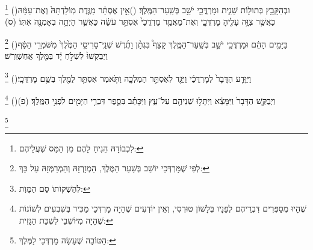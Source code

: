 \documentclass[12pt, openany]{book}
\newcommand{\footnotecomment}[1]{
	\renewcommand\thefootnote{}
	\footnote{\textsf{#1}}}
\newcommand{\commenta}[1]{\footnotecomment{#1}\hspace{0em}}
\newcommand{\vsnum}[1]{(\hebrewnumeral{#1})\space}
\begin{document}
\begin{multicols}{2}
\commenta{ לִכְבוֹדָהּ הֵנִיחַ לָהֶם מִן הַמַּס שֶׁעֲלֵיהֶם:}%
\vsnum{19}וּבְהִקָּבֵ֥ץ בְּתוּל֖וֹת שֵׁנִ֑ית וּמָרְדֳּכַ֖י יֹשֵׁ֥ב בְּשַֽׁעַר־הַמֶּֽלֶךְ׃
\vsnum{20}אֵ֣ין אֶסְתֵּ֗ר מַגֶּ֤דֶת מֽוֹלַדְתָּהּ֙ וְאֶת־עַמָּ֔הּ כַּאֲשֶׁ֛ר צִוָּ֥ה עָלֶ֖יהָ מָרְדֳּכָ֑י וְאֶת־מַאֲמַ֤ר מָרְדֳּכַי֙ אֶסְתֵּ֣ר עֹשָׂ֔ה כַּאֲשֶׁ֛ר הָיְתָ֥ה בְאָמְנָ֖ה אִתּֽוֹ׃ (ס)%
\commenta{ לְפִי שֶׁמָּרְדְּכַי יוֹשֵׁב בְּשַׁעַר הַמֶּלֶךְ, הַמְזָרְזָהּ וְהַמְרַמְּזָהּ עַל כָּךְ: }%
\vsnum{21}בַּיָּמִ֣ים הָהֵ֔ם וּמָרְדֳּכַ֖י יֹשֵׁ֣ב בְּשַֽׁעַר־הַמֶּ֑לֶךְ קָצַף֩ בִּגְתָ֨ן וָתֶ֜רֶשׁ שְׁנֵֽי־סָרִיסֵ֤י הַמֶּ֙לֶךְ֙ מִשֹּׁמְרֵ֣י הַסַּ֔ף וַיְבַקְשׁוּ֙ לִשְׁלֹ֣חַ יָ֔ד בַּמֶּ֖לֶךְ אֲחַשְׁוֵֽרֹשׁ׃%
\commenta{ לְהַשְׁקוֹתוֹ סַם הַמָּוֶת:}%
\vsnum{22}וַיִּוָּדַ֤ע הַדָּבָר֙ לְמָרְדֳּכַ֔י וַיַּגֵּ֖ד לְאֶסְתֵּ֣ר הַמַּלְכָּ֑ה וַתֹּ֧אמֶר אֶסְתֵּ֛ר לַמֶּ֖לֶךְ בְּשֵׁ֥ם מָרְדֳּכָֽי׃%
\commenta{ שֶׁהָיוּ מְסַפְּרִים דִּבְרֵיהֶם לְפָנָיו בְּלָשׁוֹן טוּרְסִי, וְאֵין יוֹדְעִים שֶׁהָיָה מָרְדְּכַי מַכִּיר בְּשִׁבְעִים לְשׁוֹנוֹת שֶׁהָיָה מִיּוֹשְׁבֵי לִשְׁכַּת הַגָּזִית: }%
\vsnum{23}וַיְבֻקַּ֤שׁ הַדָּבָר֙ וַיִּמָּצֵ֔א וַיִּתָּל֥וּ שְׁנֵיהֶ֖ם עַל־עֵ֑ץ וַיִּכָּתֵ֗ב בְּסֵ֛פֶר דִּבְרֵ֥י הַיָּמִ֖ים לִפְנֵ֥י הַמֶּֽלֶךְ׃ (פ)%
\commenta{ הַטּוֹבָה שֶׁעָשָׂה מָרְדְּכַי לַמֶּלֶךְ:}%
\end{multicols}\newpage
\end{document}
